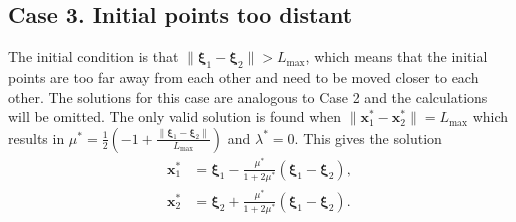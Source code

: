 \subsection{Case 3. Initial points too distant}
%
The initial condition is that $ \| \boldsymbol{\xi}_1 - \boldsymbol{\xi}_2 \| > L_{\max}$,
which means that the initial points are too far away from each other and need to
be moved closer to each other.
The solutions for this case are analogous to Case 2 and the calculations 
will be omitted. The only valid solution is found when
$\| \textbf{x}_1^* - \textbf{x}_2^*  \| = L_{\max}$ which results in
$\mu^* = \frac{1}{2} \left( - 1 + \frac{\| \boldsymbol{\xi}_1 - \boldsymbol{\xi}_2 \|}{L_{\max}} \right)$
and $\lambda^* = 0$. This gives the solution 
\begin{equation}
\begin{aligned}
\textbf{x}_1^* &= \boldsymbol{\xi}_1 - \frac{\mu^*}{1 + 2\mu^*} (\boldsymbol{\xi}_1 - \boldsymbol{\xi}_2), \\
\textbf{x}_2^* &= \boldsymbol{\xi}_2 + \frac{\mu^*}{1 + 2\mu^*} (\boldsymbol{\xi}_1 - \boldsymbol{\xi}_2).
\end{aligned}
\end{equation}

%
%
%
